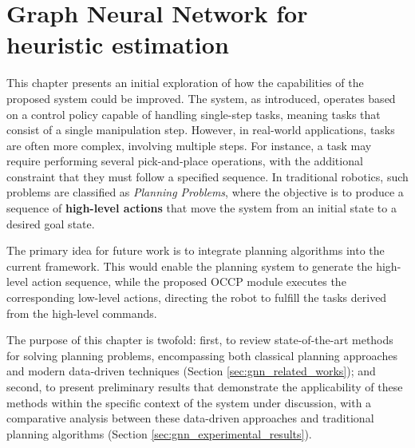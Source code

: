 \chapter{Graph Neural Network for heuristic estimation}
\label{ch:gnn_planning_systems}
This chapter presents an initial exploration of how the capabilities of the proposed system could be improved. The system, as introduced, operates based on a control policy capable of handling single-step tasks, meaning tasks that consist of a single manipulation step. However, in real-world applications, tasks are often more complex, involving multiple steps. For instance, a task may require performing several pick-and-place operations, with the additional constraint that they must follow a specified sequence. In traditional robotics, such problems are classified as \textit{Planning Problems}, where the objective is to produce a sequence of \textbf{high-level actions} that move the system from an initial state to a desired goal state. 

The primary idea for future work is to integrate planning algorithms into the current framework. This would enable the planning system to generate the high-level action sequence, while the proposed OCCP module executes the corresponding low-level actions, directing the robot to fulfill the tasks derived from the high-level commands.

The purpose of this chapter is twofold: first, to review state-of-the-art methods for solving planning problems, encompassing both classical planning approaches and modern data-driven techniques (Section \ref{sec:gnn_related_works}); and second, to present preliminary results that demonstrate the applicability of these methods within the specific context of the system under discussion, with a comparative analysis between these data-driven approaches and traditional planning algorithms (Section \ref{sec:gnn_experimental_results}).




